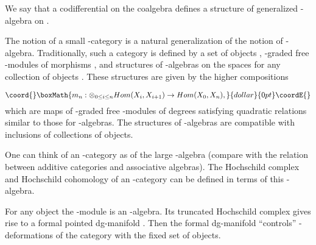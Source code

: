 \documentclass[a4paper,12pt]{article}
\begin{document}
\begin{dfn} We say that a codifferential on the coalgebra
\coordHE{} defines a structure of
generalized \myHighlight{$\A$}\coordHE{}-algebra on \coordHE{}.


\end{dfn}

The notion of a small \myHighlight{$\A$}\coordHE{}-category is a natural generalization of the notion of
\myHighlight{$\A$}\coordHE{}-algebra. Traditionally, such a category  is defined by a set of objects \coordHE{},
\myHighlight{$\Z$}\coordHE{}-graded free \coordHE{}-modules of morphisms \coordHE{},
and structures of \myHighlight{$\A$}\coordHE{}-algebras on the
spaces \coordHE{} for any collection
of objects \coordHE{}. These structures are 
given by the higher compositions

$$\coord{}\boxMath{m_n:\otimes_{0\le i\le n}Hom(X_i,X_{i+1})\to Hom(X_0,X_n),}{dollar}{0pt}\coordE{}$$
which are maps of \myHighlight{$\Z$}\coordHE{}-graded free \coordHE{}-modules of degrees \coordHE{}
satisfying quadratic relations similar to those for \myHighlight{$\A$}\coordHE{}-algebras.
The structures of \myHighlight{$\A$}\coordHE{}-algebras are compatible with inclusions
of collections of objects.

One can think of an \myHighlight{$\A$}\coordHE{}-category \coordHE{} as of the large \myHighlight{$\A$}\coordHE{}-algebra
\coordHE{} (compare with the relation between
additive categories and associative algebras). 
The Hochschild complex and Hochschild
cohomology of an \myHighlight{$\A$}\coordHE{}-category can be defined in terms of this \myHighlight{$\A$}\coordHE{}-algebra.

For any object \coordHE{} the \coordHE{}-module \coordHE{}
is an \myHighlight{$\A$}\coordHE{}-algebra. Its truncated  Hochschild complex
gives rise to a formal pointed dg-manifold \coordHE{}.
Then the formal dg-manifold \coordHE{}
``controls'' \myHighlight{$\A$}\coordHE{}-deformations of the category \coordHE{} with the fixed
set of objects.
\end{document}
